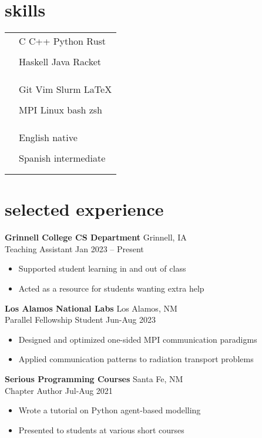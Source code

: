 \documentclass[12pt]{article}
\newcommand{\entry}[4]{{{\textbf{#1}}} \hfill #3 \\ #2 \hfill #4}
\newcommand{\tableentry}[3]{\textsc{#1} & #2\expandafter\ifstrequal\expandafter{#3}{}{\\}{\\[6pt]}}
\begin{document}
\begin{paracol}{2}
\switchcolumn{}

\section{skills}
\begin{supertabular}{rl}
	\tableentry{\footnotesize\faCode}{C \textperiodcentered{} C++ \textperiodcentered{} Python \textperiodcentered{} Rust}{}
	\tableentry{}{Haskell \textperiodcentered{} Java \textperiodcentered{} Racket}{}
  \tableentry{}{}{}

  \tableentry{\footnotesize\faWrench}{Git \textperiodcentered{} Vim \textperiodcentered{} Slurm \textperiodcentered{} LaTeX}{}
	\tableentry{}{MPI \textperiodcentered{} Linux \textperiodcentered{} bash \textperiodcentered{} zsh}{}
  \tableentry{}{}{}

  \tableentry{\footnotesize\faLanguage}{English \textperiodcentered{} native}{}
  \tableentry{}{Spanish \textperiodcentered{} intermediate}{}
\end{supertabular}

\switchcolumn*

\section{selected experience}

\entry{Grinnell College CS Department}{Teaching Assistant}{Grinnell, IA}{Jan 2023 -- Present}
\begin{itemize}[noitemsep,leftmargin=3.5mm,rightmargin=0mm,topsep=6pt]
  \item Supported student learning in and out of class
  \item Acted as a resource for students wanting extra help
\end{itemize}

\medskip

\entry{Los Alamos National Labs}{Parallel Fellowship Student}{Los Alamos, NM}{Jun-Aug 2023}
\begin{itemize}[noitemsep,leftmargin=3.5mm,rightmargin=0mm,topsep=6pt]
  \item Designed and optimized one-sided MPI communication paradigms
  \item Applied communication patterns to radiation transport problems
\end{itemize}

\medskip

\entry{Serious Programming Courses}{Chapter Author}{Santa Fe, NM}{Jul-Aug 2021}
\begin{itemize}[noitemsep,leftmargin=3.5mm,rightmargin=0mm,topsep=6pt]
  \item Wrote a tutorial on Python agent-based modelling
  \item Presented to students at various short courses
\end{itemize}


\end{paracol}
\end{document}

